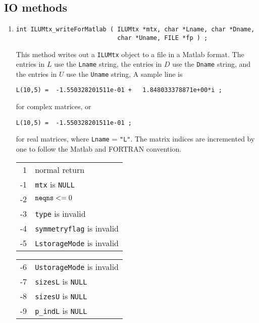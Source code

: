 \subsection{IO methods}
\label{subsection:ILUMtx:proto:IO}
\par
\begin{enumerate}
\item
\begin{verbatim}
int ILUMtx_writeForMatlab ( ILUMtx *mtx, char *Lname, char *Dname,
                            char *Uname, FILE *fp ) ;
\end{verbatim}
\par
This method writes out a {\tt ILUMtx} object to a file in a Matlab
format.
The entries in $L$ use the {\tt Lname} string,
the entries in $D$ use the {\tt Dname} string,
and the entries in $U$ use the {\tt Uname} string,
A sample line is
\begin{verbatim}
L(10,5) =  -1.550328201511e-01 +   1.848033378871e+00*i ;
\end{verbatim}
for complex matrices, or
\begin{verbatim}
L(10,5) =  -1.550328201511e-01 ;
\end{verbatim}
for real matrices, where {\tt Lname} = {\tt "L"}.
The matrix indices are incremented by one to follow the Matlab and
FORTRAN convention.
\par {}
\begin{center}
\begin{tabular}{rl}
 1 & normal return \\
-1 & {\tt mtx} is {\tt NULL} \\
-2 & ${\tt neqns} <= 0$ \\
-3 & {\tt type} is invalid \\
-4 & {\tt symmetryflag} is invalid \\
-5 & {\tt LstorageMode} is invalid \\
\end{tabular}
\quad
\begin{tabular}{rl}
-6 & {\tt UstorageMode} is invalid \\
-7 & {\tt sizesL} is {\tt NULL} \\
-8 & {\tt sizesU} is {\tt NULL} \\
-9 & {\tt p\_indL} is {\tt NULL} \\

\end{tabular}
\end{center}
\end{enumerate}
